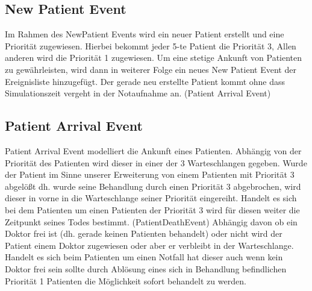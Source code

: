 \documentclass[12pt,fleqn,a4paper]{article}
\begin{document}
\subsection{New Patient Event}
Im Rahmen des NewPatient Events wird ein neuer Patient erstellt und eine Priorit\"{a}t zugewiesen.
Hierbei bekommt jeder 5-te Patient die Priorit\"{a}t 3,
Allen anderen wird die Priorit\"{a}t 1 zugewiesen. Um eine stetige Ankunft von Patienten zu gew\"{a}hrleisten, wird dann in weiterer Folge ein neues New Patient Event der Ereignisliste hinzugef\"{u}gt. Der gerade neu erstellte Patient kommt ohne dass Simulationszeit vergeht in der Notaufnahme an. (Patient Arrival Event)
\begin{center}
\end{center}




\subsection{Patient Arrival Event}
Patient Arrival Event modelliert die Ankunft eines Patienten.
Abh\"{a}ngig von der Priorit\"{a}t des Patienten wird dieser in einer der 3 Warteschlangen gegeben. Wurde der Patient im Sinne unserer Erweiterung von einem Patienten mit Priorit\"{a}t 3 abgel\"{o}\ss t dh. wurde seine Behandlung durch einen Priorit\"{a}t 3 abgebrochen, wird dieser in vorne in die Warteschlange seiner Priorit\"{a}t eingereiht. Handelt es sich bei dem Patienten um einen Patienten der Priorit\"{a}t 3 wird f\"{u}r diesen weiter die Zeitpunkt seines Todes bestimmt. (PatientDeathEvent)
Abh\"{a}ngig davon ob ein Doktor frei ist (dh. gerade keinen Patienten behandelt) oder nicht wird der Patient einem Doktor zugewiesen oder aber er verbleibt in der Warteschlange.
Handelt es sich beim Patienten um einen Notfall hat dieser auch wenn kein Doktor frei sein sollte durch Abl\"{o}sung eines sich in Behandlung befindlichen Priorit\"{a}t 1 Patienten die M\"{o}glichkeit sofort behandelt zu werden.


\begin{center}
\end{center}
\end{document}
